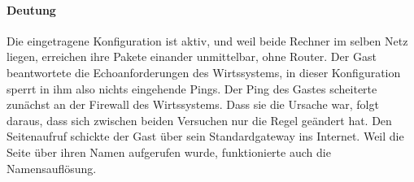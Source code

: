 \begin{messung}
\paragraph{Deutung} Die eingetragene Konfiguration ist aktiv, und weil beide Rechner im selben Netz liegen, erreichen ihre Pakete einander unmittelbar, ohne Router. Der Gast beantwortete die Echoanforderungen des Wirtssystems, in dieser Konfiguration sperrt in ihm also nichts eingehende Pings. Der Ping des Gastes scheiterte zunächst an der Firewall des Wirtssystems. Dass sie die Ursache war, folgt daraus, dass sich zwischen beiden Versuchen nur die Regel geändert hat. Den Seitenaufruf schickte der Gast über sein Standardgateway ins Internet. Weil die Seite über ihren Namen aufgerufen wurde, funktionierte auch die Namensauflösung.
\end{messung}


